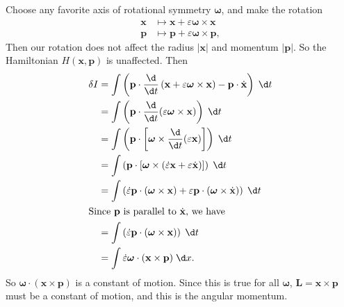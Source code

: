 \documentclass[a4paper]{article}
\begin{document}
\begin{eg}
\begin{enumerate}
      Choose any favorite axis of rotational symmetry $\boldsymbol\omega$, and make the rotation
      \begin{align*}
        \mathbf{x}&\mapsto \mathbf{x} + \varepsilon\boldsymbol\omega\times \mathbf{x}\\
        \mathbf{p}&\mapsto \mathbf{p} + \varepsilon\boldsymbol\omega\times \mathbf{p},
      \end{align*}
      Then our rotation does not affect the radius $|\mathbf{x}|$ and momentum $|\mathbf{p}|$. So the Hamiltonian $H(\mathbf{x}, \mathbf{p})$ is unaffected. Then
      \begin{align*}
        \delta I &= \int \left(\mathbf{p}\cdot \frac{\d}{\d t}\left(\mathbf{x} + \varepsilon\boldsymbol\omega \times \mathbf{x}\right) - \mathbf{p}\cdot \dot{\mathbf{x}}\right)\;\d t\\
        &= \int \left(\mathbf{p}\cdot \frac{\d}{\d t}(\varepsilon\boldsymbol\omega\times \mathbf{x})\right)\;\d t\\
        &= \int \left(\mathbf{p}\cdot \left[\boldsymbol\omega\times \frac{\d}{\d t}(\varepsilon\mathbf{x})\right]\right)\;\d t\\
        &= \int \left(\mathbf{p}\cdot \left[\boldsymbol\omega\times (\dot{\varepsilon} \mathbf{x} + \varepsilon \dot{\mathbf{x}})\right]\right)\;\d t\\
        &= \int \left(\dot{\varepsilon}\mathbf{p}\cdot (\boldsymbol\omega\times \mathbf{x}) + \varepsilon \mathbf{p}\cdot (\boldsymbol\omega \times \dot{\mathbf{x}})\right)\;\d t\\
        \intertext{Since $\mathbf{p}$ is parallel to $\dot{\mathbf{x}}$, we have}
        &= \int \left(\dot{\varepsilon}\mathbf{p}\cdot (\boldsymbol\omega\times \mathbf{x})\right)\;\d t\\
        &= \int \dot{\varepsilon}\boldsymbol\omega\cdot (\mathbf{x}\times \mathbf{p})\;\d x.
      \end{align*}
      So $\boldsymbol\omega\cdot (\mathbf{x}\times \mathbf{p})$ is a constant of motion. Since this is true for all $\boldsymbol\omega$, $\mathbf{L} = \mathbf{x}\times \mathbf{p}$ must be a constant of motion, and this is the angular momentum.
  \end{enumerate}
\end{eg}
\end{document}
